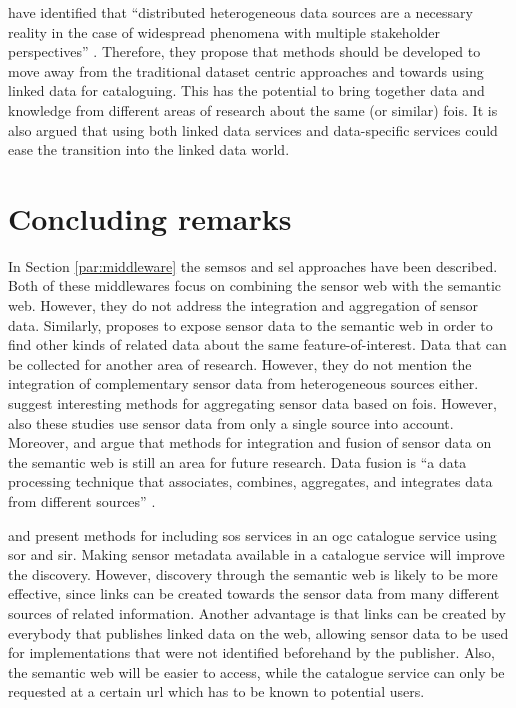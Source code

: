 \cite{SSW:Atkinson} have identified that \enquote{distributed heterogeneous data sources are a necessary reality in the case of widespread phenomena with multiple stakeholder perspectives} \cite[p.129]{SSW:Atkinson}. Therefore, they propose that methods should be developed to move away from the traditional dataset centric approaches and towards using linked data for cataloguing. This has the potential to bring together data and knowledge from different areas of research about the same (or similar) \acp{foi}. It is also argued that using both linked data services and data-specific services could ease the transition into the linked data world.  

\section{Concluding remarks}
\label{par:LDmetadata}
In Section \ref{par:middleware} the \ac{semsos} \citep{SSW:Henson, SSW:Pschorr} and \ac{sel} \citep{SSW:Janowicz} approaches have been described. Both of these middlewares focus on combining the sensor web with the semantic web. However, they do not address the integration and aggregation of sensor data. Similarly, \cite{SSW:Atkinson} proposes to expose sensor data to the semantic web in order to find other kinds of related data about the same feature-of-interest. Data that can be collected for another area of research. However, they do not mention the integration of complementary sensor data from heterogeneous sources either. \citet{SSW:Stasch3,SSW:Stasch} suggest interesting methods for aggregating sensor data based on \acfp{foi}. However, also these studies use sensor data from only a single source into account. Moreover, \cite{SSW:Corcho} and \cite{SSW:Ji} argue that methods for integration and fusion of sensor data on the semantic web is still an area for future research. Data fusion is \enquote{a data processing technique that associates, combines, aggregates, and integrates data from different sources} \cite[p. 2]{SSW:Wang2}. 

\cite{SW:OGC4} and \cite{SW:OGC3} present methods for including \ac{sos} services in an \ac{ogc} catalogue service using \ac{sor} and \ac{sir}. Making sensor metadata available in a catalogue service will improve the discovery. However, discovery through the semantic web is likely to be more effective, since links can be created towards the sensor data from many different sources of related information. Another advantage is that links can be created by everybody that publishes linked data on the web, allowing sensor data to be used for implementations that were not identified beforehand by the publisher. Also, the semantic web will be easier to access, while the catalogue service can only be requested at a certain \ac{url} which has to be known to potential users. 

